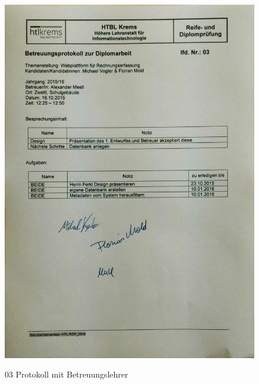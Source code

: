 \begin{figure}[!h]
    \centering
    \includegraphics[width=13cm]{figures/Mestl_03.jpg}
    \label{fig:03_Protokoll_Betreuungslehrer}
    \caption{03 Protokoll mit Betreuungslehrer}
\end{figure}
\newpage
